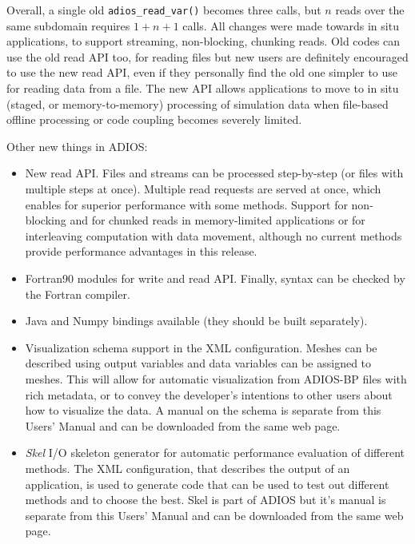 Overall, a single old \verb+adios_read_var()+ becomes three calls, but $n$ reads over the same subdomain requires $1+n+1$ calls.  
All changes were made towards in situ applications, to support streaming, non-blocking, chunking reads. 
Old codes can use the old read API too, for reading files but new users are definitely encouraged to use the new read API, even if they personally find the old one simpler to use for reading data from a file. The new API allows applications to move to in situ (staged, or memory-to-memory) processing of simulation data when file-based offline processing or code coupling becomes severely limited.  

Other new things in ADIOS:
\begin{itemize}
\item New read API. Files and streams can be processed step-by-step (or files with multiple steps at once). Multiple read requests are served at once, which enables for superior performance with some methods. Support for non-blocking and for chunked reads in memory-limited applications or for interleaving computation with data movement, although no current methods provide performance advantages in this release.  
\item Fortran90 modules for write and read API. Finally, syntax can be checked by the Fortran compiler.
\item Java and Numpy bindings available (they should be built separately).
\item Visualization schema support in the XML configuration. Meshes can be described using output variables and data variables can be assigned to meshes. This will allow for automatic visualization from ADIOS-BP files with rich metadata, or to convey the developer's intentions to other users about how to visualize the data. A manual on the schema is separate from this Users' Manual and can be downloaded from the same web page. 
\item \emph{Skel} I/O skeleton generator for automatic performance evaluation of different methods. The XML configuration, that describes the output of an application, is used to generate code that can be used to test out different methods and to choose the best. Skel is part of ADIOS but it's manual is separate from this Users' Manual and can be downloaded from the same web page. 
\end{itemize}

